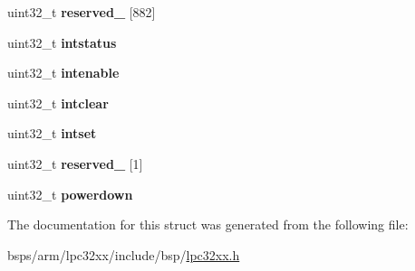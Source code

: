 \begin{DoxyCompactItemize}
uint32\+\_\+t {\bfseries reserved\+\_} \mbox{[}882\mbox{]}
\item 
\mbox{\label{structlpc32xx__eth_a0d1f00595e45937ca944391afb8c95f0}} 
uint32\+\_\+t {\bfseries intstatus}
\item 
\mbox{\label{structlpc32xx__eth_a0dc48b51e92f09b3a7c4e0841d85ccde}} 
uint32\+\_\+t {\bfseries intenable}
\item 
\mbox{\label{structlpc32xx__eth_a713c8ff738fa7bc240b20070d1f82553}} 
uint32\+\_\+t {\bfseries intclear}
\item 
\mbox{\label{structlpc32xx__eth_a5ea1b568f34be809614f8bce441f9c4c}} 
uint32\+\_\+t {\bfseries intset}
\item 
\mbox{\label{structlpc32xx__eth_a4739afaa62de0bb68bdb708e6d60d170}} 
uint32\+\_\+t {\bfseries reserved\+\_} \mbox{[}1\mbox{]}
\item 
\mbox{\label{structlpc32xx__eth_a52b14e3f4da775595decb34f0d73aba4}} 
uint32\+\_\+t {\bfseries powerdown}
\end{DoxyCompactItemize}


The documentation for this struct was generated from the following file\+:\begin{DoxyCompactItemize}
\item 
bsps/arm/lpc32xx/include/bsp/\mbox{\hyperlink{lpc32xx_8h}{lpc32xx.\+h}}\end{DoxyCompactItemize}
